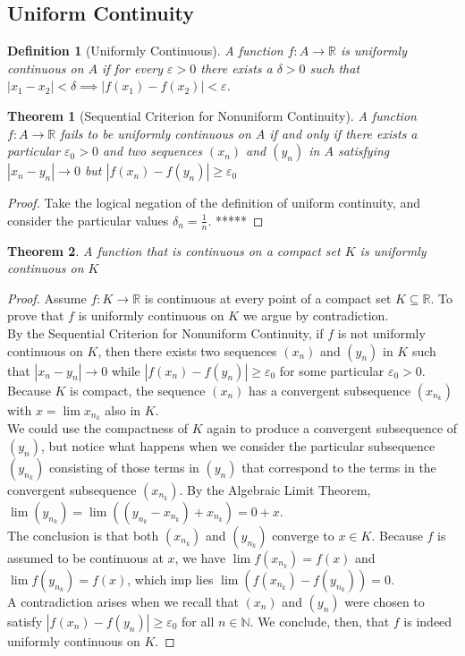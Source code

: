 \documentclass[10pt]{report}
\newtheorem{thm3}{Theorem}[subsection]
\newtheorem{def3}{Definition}[subsection]
\newcommand{\eps}{\varepsilon}
\begin{document}
\subsection{Uniform Continuity}
\begin{def3}[Uniformly Continuous]
A function $f:A\to\mathbb{R}$ is uniformly continuous on $A$ if for every $\eps>0$ there exists a $\delta>0$ such that $|x_1-x_2|<\delta\implies |f(x_1)-f(x_2)|<\eps$.
\end{def3}
\begin{thm3}[Sequential Criterion for Nonuniform Continuity]
A function $f:A\to\mathbb{R}$ fails to be uniformly continuous on $A$ if and only if there exists a particular $\eps_0>0$ and two sequences $(x_n)$ and $(y_n)$ in $A$ satisfying $|x_n-y_n|\to 0$ but $|f(x_n)-f(y_n)|\geq \eps_0$
\end{thm3}
\begin{proof}
Take the logical negation of the definition of uniform continuity, and consider the particular values $\delta_n = \frac{1}{n}$. *****
\end{proof}
\begin{thm3}
A function that is continuous on a compact set $K$ is uniformly continuous on $K$
\end{thm3}
\begin{proof}
Assume $f:K\to\mathbb{R}$ is continuous at every point of a compact set $K\subseteq \mathbb{R}$. To prove that $f$ is uniformly continuous on $K$ we argue by contradiction.\\
By the Sequential Criterion for Nonuniform Continuity, if $f$ is not uniformly continuous on $K$, then there exists two sequences $(x_n)$ and $(y_n)$ in $K$ such that $|x_n-y_n|\to 0$ while $|f(x_n)-f(y_n)|\geq \eps_0$ for some particular $\eps_0>0$. Because $K$ is compact, the sequence $(x_n)$ has a convergent subsequence $(x_{n_k})$ with $x=\lim x_{n_k}$ also in $K$.\\
We could use the compactness of $K$ again to produce a convergent subsequence of $(y_n)$, but notice what happens when we consider the particular subsequence $(y_{n_k})$ consisting of those terms in $(y_n)$ that correspond to the terms in the convergent subsequence $(x_{n_k})$. By the Algebraic Limit Theorem, $\lim (y_{n_k}) = \lim ((y_{n_k} - x_{n_k}) + x_{n_k}) = 0 + x$.\\
The conclusion is that both $(x_{n_k})$ and $(y_{n_k})$ converge to $x\in K$. Because $f$ is assumed to be continuous at $x$, we have $\lim f(x_{n_k}) = f(x)$ and $\lim f(y_{n_k}) = f(x)$, which imp lies $\lim(f(x_{n_k})- f(y_{n_k})) = 0$.\\
A contradiction arises when we recall that $(x_n)$ and $(y_n)$ were chosen to satisfy $|f(x_n) - f(y_n)|\geq \eps_0$ for all $n\in\mathbb{N}$. We conclude, then, that $f$ is indeed uniformly continuous on $K$.
\end{proof}
\end{document}
